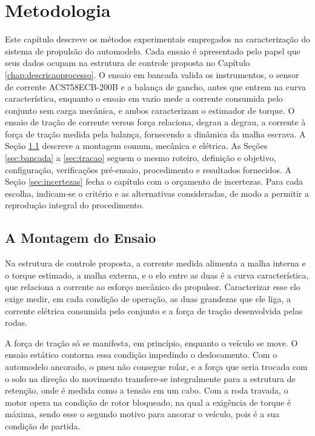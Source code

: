 \chapter{Metodologia}
\label{chap:metodologia}

Este capítulo descreve os métodos experimentais empregados na caracterização do
sistema de propulsão do automodelo. Cada ensaio é apresentado pelo papel que
seus dados ocupam na estrutura de controle proposta no Capítulo
\ref{chap:descricaoprocesso}. O ensaio em bancada valida os instrumentos, o
sensor de corrente ACS758ECB-200B e a balança de gancho, antes que
entrem na curva característica, enquanto o ensaio em vazio mede a corrente consumida
pelo conjunto sem carga mecânica, e ambos caracterizam o estimador de torque. O ensaio de tração
de corrente versus força relaciona, degrau a degrau, a corrente à força de
tração medida pela balança, fornecendo a dinâmica da malha escrava. A
Seção \ref{sec:montagem} descreve a montagem comum, mecânica e elétrica. As
Seções \ref{sec:bancada} a \ref{sec:tracao} seguem o mesmo roteiro, definição
e objetivo, configuração, verificações pré-ensaio, procedimento e resultados
fornecidos. A Seção \ref{sec:incertezas} fecha o capítulo com o orçamento de
incertezas. Para cada escolha, indicam-se o critério e as alternativas
consideradas, de modo a permitir a reprodução integral do procedimento.

\section{A Montagem do Ensaio}
\label{sec:montagem}

Na estrutura de controle proposta, a corrente medida alimenta a malha interna e o torque
estimado, a malha externa, e o elo entre as duas é a curva característica, que relaciona a
corrente ao esforço mecânico do propulsor. Caracterizar esse elo exige medir, em cada
condição de operação, as duas grandezas que ele liga, a corrente elétrica consumida pelo
conjunto e a força de tração desenvolvida pelas rodas.

A força de tração só se manifesta, em princípio, enquanto o veículo se move. O ensaio
estático contorna essa condição impedindo o deslocamento. Com o automodelo ancorado, o
pneu não consegue rolar, e a força que seria trocada com o solo na direção do movimento
transfere-se integralmente para a estrutura de retenção, onde é medida como a tensão em um
cabo. Com a roda travada, o motor opera na condição de rotor
bloqueado, na qual a exigência de torque é máxima, sendo esse o segundo motivo para ancorar o
veículo, pois é a sua condição de partida. 

